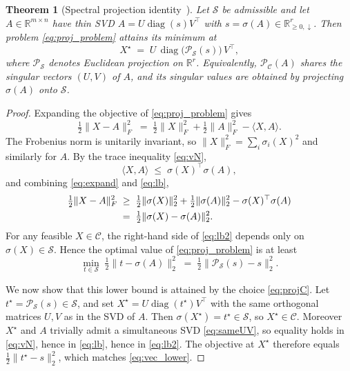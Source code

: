 \documentclass[10pt,a4paper]{amsart}
\newtheorem{theorem}{Theorem}
\DeclareMathOperator{\diag}{diag}
\newcommand{\R}{\mathbb{R}}
\newcommand{\sgm}{\sigma}
\newcommand{\proj}{\mathcal{P}}
\newcommand{\spec}{\mathcal{S}}
\newcommand{\Cset}{\mathcal{C}}
\begin{document}
\begin{theorem}[Spectral projection identity~\cite{lewis1995,beck}]
\label{thm:proj}
Let $\spec$ be admissible and let $A \in \R^{m\times n}$ have thin SVD
$A = U \diag(s) V^\top$ with $s = \sgm(A) \in \R^r_{\ge 0,\downarrow}$.
Then problem \eqref{eq:proj_problem} attains its minimum at
\begin{equation}\label{eq:projC}
X^\star \;=\; U\,\diag\!\bigl(\proj_\spec(s)\bigr)\,V^\top,
\end{equation}
where $\proj_\spec$ denotes Euclidean projection on $\R^r$. Equivalently,
$\proj_\Cset(A)$ shares the singular vectors $(U, V)$ of $A$, and its
singular values are obtained by projecting $\sgm(A)$ onto $\spec$.
\end{theorem}

\begin{proof}
Expanding the objective of \eqref{eq:proj_problem} gives
\begin{equation}\label{eq:expand}
\tfrac{1}{2}\|X - A\|_F^2 \;=\; \tfrac{1}{2}\|X\|_F^2 + \tfrac{1}{2}\|A\|_F^2 - \langle X, A\rangle.
\end{equation}
The Frobenius norm is unitarily invariant, so
$\|X\|_F^2 = \sum_i \sgm_i(X)^2$ and similarly for $A$. By the
trace inequality \eqref{eq:vN},
\begin{equation}\label{eq:lb}
\langle X, A\rangle \;\le\; \sgm(X)^\top \sgm(A),
\end{equation}
and combining \eqref{eq:expand} and \eqref{eq:lb},
\begin{align}
\tfrac{1}{2}\|X - A\|_F^2
&\;\ge\;
\tfrac{1}{2}\|\sgm(X)\|_2^2 + \tfrac{1}{2}\|\sgm(A)\|_2^2 - \sgm(X)^\top \sgm(A) \notag \\
&\;=\;
\tfrac{1}{2}\|\sgm(X) - \sgm(A)\|_2^2.
\label{eq:lb2}
\end{align}
For any feasible $X \in \Cset$, the right-hand side of \eqref{eq:lb2}
depends only on $\sgm(X) \in \spec$. Hence the optimal value of
\eqref{eq:proj_problem} is at least
\begin{equation}\label{eq:vec_lower}
\min_{t \in \spec}\;\tfrac{1}{2}\|t - \sgm(A)\|_2^2
\;=\;\tfrac{1}{2}\|\proj_\spec(s) - s\|_2^2.
\end{equation}

We now show that this lower bound is attained by the choice
\eqref{eq:projC}. Let $t^\star = \proj_\spec(s) \in \spec$, and set
$X^\star = U \diag(t^\star) V^\top$ with the same orthogonal matrices
$U, V$ as in the SVD of $A$. Then $\sgm(X^\star) = t^\star \in \spec$,
so $X^\star \in \Cset$. Moreover $X^\star$ and $A$ trivially admit a
simultaneous SVD \eqref{eq:sameUV}, so equality holds in
\eqref{eq:vN}, hence in \eqref{eq:lb}, hence in \eqref{eq:lb2}. The
objective at $X^\star$ therefore equals
$\tfrac{1}{2}\|t^\star - s\|_2^2$, which matches \eqref{eq:vec_lower}.
\end{proof}
\end{document}
